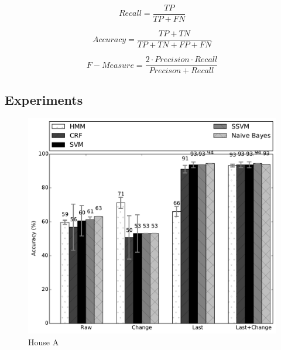 \begin{equation}
Recall = \frac{TP}{TP+FN}
\end{equation}

\begin{equation}
Accuracy = \frac{TP+TN}{TP+TN+FP+FN}
\end{equation}

\begin{equation}
F-Measure = \frac{2\cdot Precision\cdot Recall}{Precison+Recall}
\end{equation}




\subsection{Experiments}
\begin{figure}[t!]
\begin{center}
\includegraphics[width=5in]{../../src/reports/A.pdf}
\end{center}
\vspace{-0.5cm}
\caption{House A}
\label{fig:house_a}
\vspace{-0.5cm}
\end{figure}

